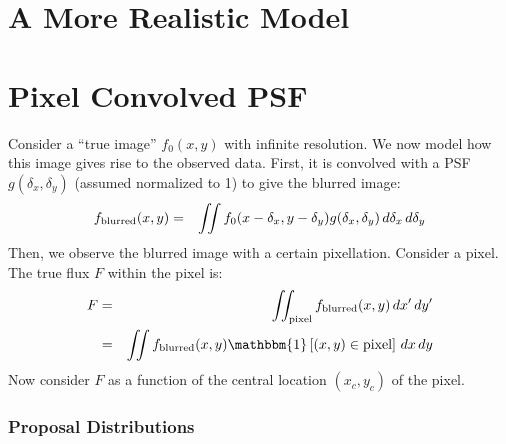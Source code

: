 \documentclass[letterpaper, 11pt]{article}
\begin{document}
\section{A More Realistic Model}
\citep{2008ApJ...682..874K}

\appendix
\section{Pixel Convolved PSF}
Consider a ``true image'' $f_0(x, y)$ with infinite resolution. We now model how
this image gives rise to the observed data. First, it is convolved with a
PSF $g(\delta_x, \delta_y)$ (assumed normalized to 1) to give the blurred image:
\begin{eqnarray}
f_{\rm{blurred}}(x, y) &=& \iint f_0(x-\delta_x, y-\delta_y)
g(\delta_x, \delta_y) \, d\delta_x \, d\delta_y \label{blur}
\end{eqnarray}
Then, we observe the blurred image with a certain pixellation. Consider a pixel.
The true flux $F$ within the pixel is:
\begin{eqnarray}
F &=& \iint_{\rm pixel} f_{\rm blurred}(x, y) \,dx'\,dy'\\
&=& \iint f_{\rm blurred}(x, y)\mathbbm{1}\left[(x,y) \in \textnormal{pixel}
\right] \,dx\,dy \label{pixel}
\end{eqnarray}
Now consider $F$ as a function of the central location $(x_c, y_c)$ of the
pixel.




\subsubsection{Proposal Distributions}
\end{document}
